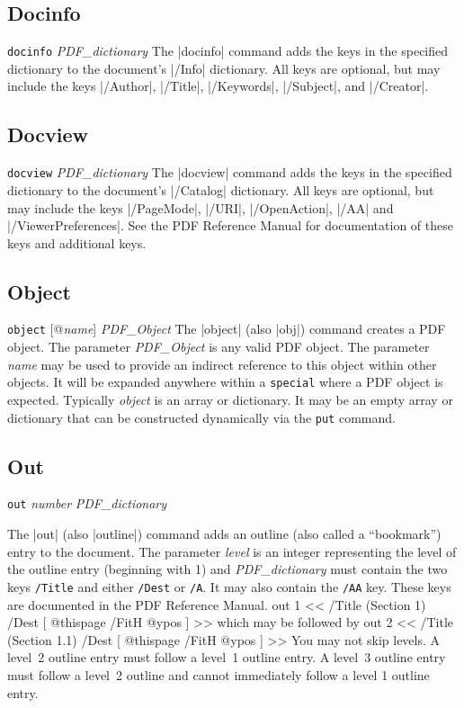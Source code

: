 {\subsection{Docinfo}
\syntax
{\tt docinfo} {\it PDF\_dictionary}
\description
The |docinfo| command adds the keys in the specified dictionary to the
document's |/Info| dictionary.  All keys are optional, but may include
the keys |/Author|, |/Title|, |/Keywords|, |/Subject|,
and |/Creator|.
\example
\begintt
{}
\endtt

\subsection{Docview}
\syntax
{\tt docview} {\it PDF\_dictionary}
\description
The |docview| command adds the keys in the specified dictionary to the
document's |/Catalog| dictionary.  All keys are optional, but may include
the keys |/PageMode|,
|/URI|, |/OpenAction|, |/AA|
and |/ViewerPreferences|.  See the PDF Reference Manual
for documentation of these keys and additional keys.
\example
\begintt
{}
\endtt


\subsection{Object}
\syntax
{\tt object} [@{\it name}] {\it PDF\_Object}
\description
The |object| (also |obj|) command creates a
PDF object.  The parameter {\it PDF\_Object} is any valid PDF object.  The
parameter {\it name} may be used to provide an indirect reference
to this object within other
objects. It will be expanded anywhere within
a {\tt special} where a PDF object is
expected. Typically {\it object} is an array
or dictionary.  It may be an empty array or
dictionary that can be constructed dynamically via
the {\tt put} command.
\example
\begintt
{}
\endtt

\subsection{Out}
\syntax
{\tt out} {\it number} {\it PDF\_dictionary}

\description
The |out| (also |outline|) command adds an outline (also called a ``bookmark'') entry
to the document.
The parameter {\it level\/} is an integer representing the
level of the outline entry (beginning with 1) and
{\it  PDF\_dictionary\/} must contain
the two keys {\tt /Title} and either {\tt /Dest} or {\tt /A}.
It may also contain the {\tt /AA} key.  These keys are documented
in the PDF Reference Manual.
\example
\begintt
out 1 << /Title (Section 1) /Dest [ @thispage /FitH @ypos ] >>
\endtt
which may be followed by
\begintt
out 2 << /Title (Section 1.1) /Dest [ @thispage /FitH @ypos ] >>
\endtt
\note
You may not skip levels.  A level~2 outline entry
must follow a level~1 outline
entry.  A level~3 outline entry must follow a level~2 outline
and cannot immediately follow a level 1 outline entry.

}

